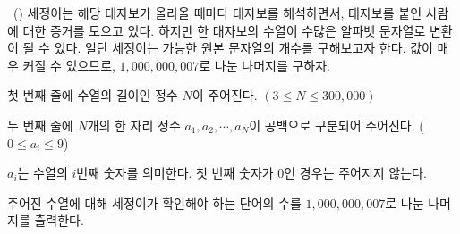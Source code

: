 \begin{problem}{\kcpcprobposter\ (\kcpcprobpostershort)}
    세정이는 해당 대자보가 올라올 때마다 대자보를 해석하면서, 대자보를 붙인 사람에 대한 증거를 모으고 있다. 하지만 한 대자보의 수열이 수많은 알파벳 문자열로 변환이 될 수 있다. 일단 세정이는 가능한 원본 문자열의 개수를 구해보고자 한다. 값이 매우 커질 수 있으므로, $ 1,000,000,007 $로 나눈 나머지를 구하자.
    
    \InputFile
    첫 번째 줄에 수열의 길이인 정수 $N$이 주어진다. $ (3 \leq N \leq 300,000)$
    
    두 번째 줄에 $N$개의 한 자리 정수 $a_1, a_2, \cdots, a_N$이 공백으로 구분되어 주어진다. ($0 \leq a_i \leq 9$)
    
    $a_i$는 수열의 $i$번째 숫자를 의미한다. 첫 번째 숫자가 0인 경우는 주어지지 않는다.
    
    \OutputFile
    주어진 수열에 대해 세정이가 확인해야 하는 단어의 수를 $ 1,000,000,007 $로 나눈 나머지를 출력한다.
    
    \Examples
    \begin{example}
    \end{example}
\end{problem}

